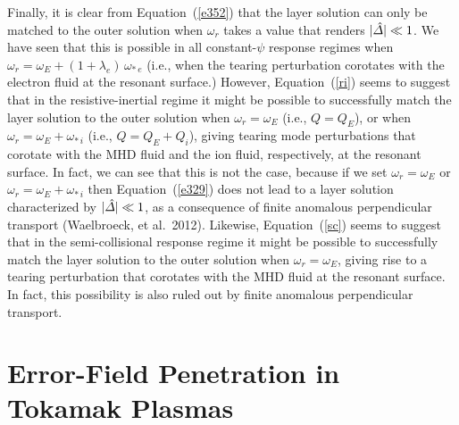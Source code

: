 \documentclass[notitlepage,12pt]{article}
\begin{document}
Finally, it is clear from Equation~(\ref{e352}) that the layer solution can only be matched to the
outer solution when $\omega_r$ takes a value that renders $|\hat{\mit\Delta}|\ll 1$. We have seen that this
is possible in all constant-$\psi$ response regimes when $\omega_r= \omega_E+(1+\lambda_e)\,\omega_{\ast\,e}$
(i.e., when the tearing perturbation corotates with the electron fluid at the resonant surface.) However, Equation~(\ref{ri})
seems to suggest that in the resistive-inertial regime it might be possible to successfully match the
layer solution to the outer solution when $\omega_r=\omega_E$ (i.e., $Q=Q_E$), or when 
$\omega_r=\omega_E+\omega_{\ast\,i}$
(i.e., $Q=Q_E+Q_i$),
giving tearing mode perturbations that corotate with the MHD fluid and the ion fluid, respectively, at the resonant
surface. In fact, we can see that this is not the case, because if we set $\omega_r=\omega_E$ or $\omega_r=\omega_E+\omega_{\ast\,i}$  then Equation~(\ref{e329}) does not lead to a layer solution characterized by  $|\hat{\mit\Delta}|\ll 1$, 
as a consequence of finite anomalous perpendicular transport (Waelbroeck, et al.\ 2012). Likewise, Equation~(\ref{sc}) seems to suggest that in the semi-collisional response regime it might be possible to successfully match the
layer solution to the outer solution when $\omega_r=\omega_E$, giving rise to a tearing perturbation that corotates with the MHD fluid at the resonant surface.  In fact, this possibility is also ruled out by finite anomalous
perpendicular transport. 

\section{Error-Field Penetration in Tokamak Plasmas}
\end{document}
